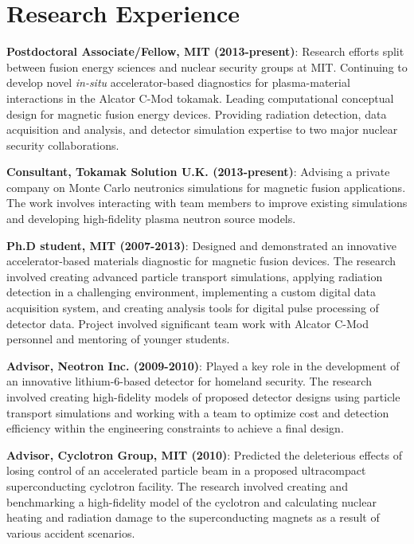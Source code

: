 \documentclass[10pt]{article}
\begin{document}
\section{Research Experience}
\begin{innerlist}
\item \textbf{Postdoctoral Associate/Fellow, MIT (2013-present)}:
  Research efforts split between fusion energy sciences and nuclear
  security groups at MIT. Continuing to develop novel \textit{in-situ}
  accelerator-based diagnostics for plasma-material interactions in
  the Alcator C-Mod tokamak. Leading computational conceptual design
  for magnetic fusion energy devices. Providing radiation detection,
  data acquisition and analysis, and detector simulation expertise to
  two major nuclear security collaborations.
  \vspace{0.2cm}
  
\item \textbf{Consultant, Tokamak Solution U.K. (2013-present)}:
   Advising a private company on Monte Carlo neutronics simulations for
   magnetic fusion applications. The work involves interacting with
   team members to improve existing simulations and developing
   high-fidelity plasma neutron source models.\vspace{0.2cm}

\item \textbf{Ph.D student, MIT (2007-2013)}: Designed and
  demonstrated an innovative accelerator-based materials diagnostic
  for magnetic fusion devices. The research involved creating advanced
  particle transport simulations, applying radiation detection in a
  challenging environment, implementing a custom digital data
  acquisition system, and creating analysis tools for digital pulse
  processing of detector data. Project involved significant team work
  with Alcator C-Mod personnel and mentoring of younger
  students.\vspace{0.2cm}

\item \textbf{Advisor, Neotron Inc. (2009-2010)}: Played a key role
  in the development of an innovative lithium-6-based detector for
  homeland security. The research involved creating high-fidelity
  models of proposed detector designs using particle transport
  simulations and working with a team to optimize cost and detection
  efficiency within the engineering constraints to achieve a final
  design.\vspace{0.2cm}
  
\item \textbf{Advisor, Cyclotron Group, MIT (2010)}: Predicted the
  deleterious effects of losing control of an accelerated particle
  beam in a proposed ultracompact superconducting cyclotron
  facility. The research involved creating and benchmarking a
  high-fidelity model of the cyclotron and calculating nuclear heating
  and radiation damage to the superconducting magnets as a result of
  various accident scenarios.\vspace{0.2cm}


\end{innerlist}
\end{document}

